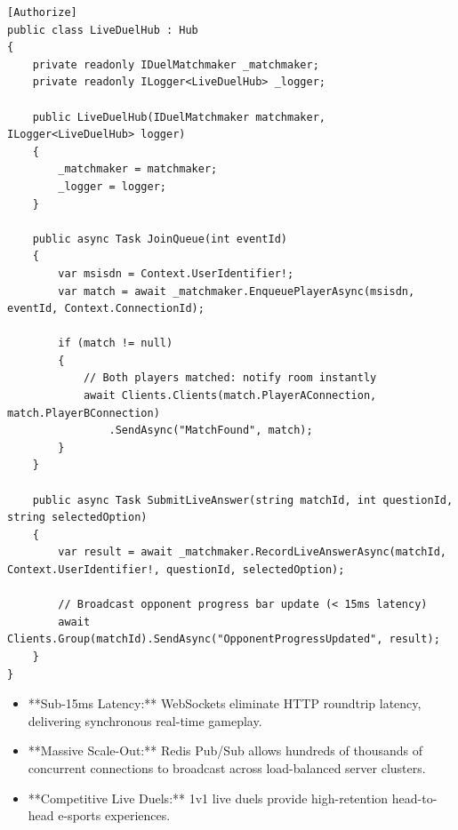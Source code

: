 \begin{lstlisting}[language={[Sharp]C}, caption={Live Tournament Duel SignalR Hub in .NET 10}]
[Authorize]
public class LiveDuelHub : Hub
{
    private readonly IDuelMatchmaker _matchmaker;
    private readonly ILogger<LiveDuelHub> _logger;

    public LiveDuelHub(IDuelMatchmaker matchmaker, ILogger<LiveDuelHub> logger)
    {
        _matchmaker = matchmaker;
        _logger = logger;
    }

    public async Task JoinQueue(int eventId)
    {
        var msisdn = Context.UserIdentifier!;
        var match = await _matchmaker.EnqueuePlayerAsync(msisdn, eventId, Context.ConnectionId);

        if (match != null)
        {
            // Both players matched: notify room instantly
            await Clients.Clients(match.PlayerAConnection, match.PlayerBConnection)
                .SendAsync("MatchFound", match);
        }
    }

    public async Task SubmitLiveAnswer(string matchId, int questionId, string selectedOption)
    {
        var result = await _matchmaker.RecordLiveAnswerAsync(matchId, Context.UserIdentifier!, questionId, selectedOption);
        
        // Broadcast opponent progress bar update (< 15ms latency)
        await Clients.Group(matchId).SendAsync("OpponentProgressUpdated", result);
    }
}
\end{lstlisting}

\begin{tcolorbox}[summarybox, title={Chapter Key Takeaways}]
\begin{itemize}
    \item **Sub-15ms Latency:** WebSockets eliminate HTTP roundtrip latency, delivering synchronous real-time gameplay.
    \item **Massive Scale-Out:** Redis Pub/Sub allows hundreds of thousands of concurrent connections to broadcast across load-balanced server clusters.
    \item **Competitive Live Duels:** 1v1 live duels provide high-retention head-to-head e-sports experiences.
\end{itemize}
\end{tcolorbox}
